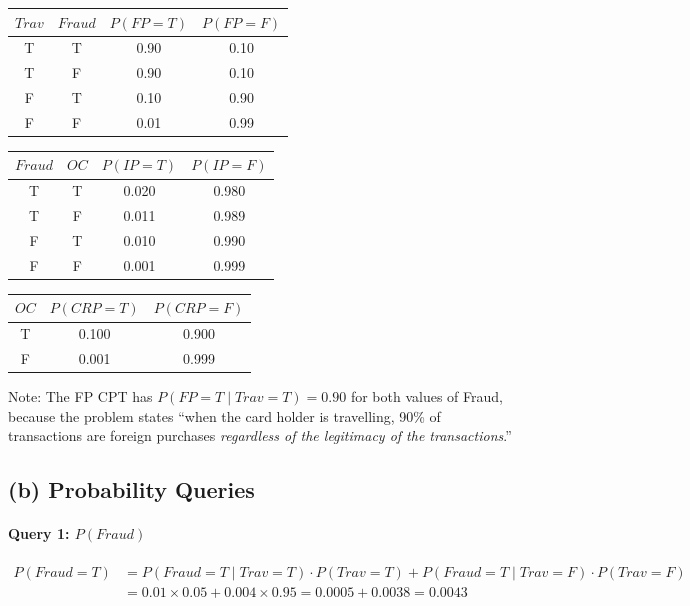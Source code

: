 \documentclass[12pt]{article}
\begin{document}
\begin{center}
\begin{tabular}{cccc}
\toprule
$\textit{Trav}$ & $\textit{Fraud}$ & $P(\textit{FP}{=}T)$ & $P(\textit{FP}{=}F)$\\
\midrule
T & T & 0.90 & 0.10\\
T & F & 0.90 & 0.10\\
F & T & 0.10 & 0.90\\
F & F & 0.01 & 0.99\\
\bottomrule
\end{tabular}
\quad
\begin{tabular}{cccc}
\toprule
$\textit{Fraud}$ & $\textit{OC}$ & $P(\textit{IP}{=}T)$ & $P(\textit{IP}{=}F)$\\
\midrule
T & T & 0.020 & 0.980\\
T & F & 0.011 & 0.989\\
F & T & 0.010 & 0.990\\
F & F & 0.001 & 0.999\\
\bottomrule
\end{tabular}
\quad
\begin{tabular}{ccc}
\toprule
$\textit{OC}$ & $P(\textit{CRP}{=}T)$ & $P(\textit{CRP}{=}F)$\\
\midrule
T & 0.100 & 0.900\\
F & 0.001 & 0.999\\
\bottomrule
\end{tabular}
\end{center}

Note: The FP CPT has $P(\textit{FP}{=}T\mid\textit{Trav}{=}T)=0.90$ for both values of Fraud,
because the problem states ``when the card holder is travelling, 90\% of transactions are
foreign purchases \emph{regardless of the legitimacy of the transactions}.''

\subsection*{(b) Probability Queries}

\paragraph{Query 1: $P(\textit{Fraud})$}

\begin{align*}
P(\textit{Fraud}{=}T)
  &=P(\textit{Fraud}{=}T\mid\textit{Trav}{=}T)\cdot P(\textit{Trav}{=}T)
   +P(\textit{Fraud}{=}T\mid\textit{Trav}{=}F)\cdot P(\textit{Trav}{=}F)\\
  &=0.01\times0.05+0.004\times0.95
   =0.0005+0.0038=\boxed{0.0043}
\end{align*}
\end{document}
